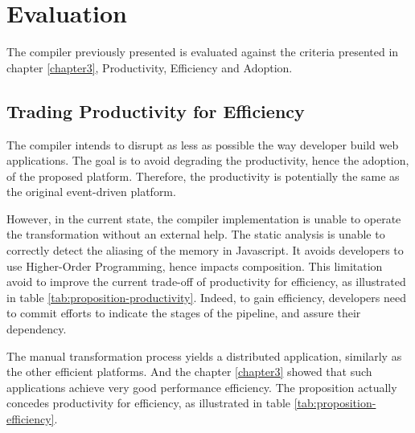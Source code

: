 \section{Evaluation} \label{chapter4:evaluation}

The compiler previously presented is evaluated against the criteria presented in chapter \ref{chapter3}, Productivity, Efficiency and Adoption.

\subsection{Trading Productivity for Efficiency}


The compiler intends to disrupt as less as possible the way developer build web applications.
The goal is to avoid degrading the productivity, hence the adoption, of the proposed platform.
Therefore, the productivity is potentially the same as the original event-driven platform.

However, in the current state, the compiler implementation is unable to operate the transformation without an external help.
The static analysis is unable to correctly detect the aliasing of the memory in Javascript.
It avoids developers to use Higher-Order Programming, hence impacts composition.
This limitation avoid to improve the current trade-off of productivity for efficiency, as illustrated in table \ref{tab:proposition-productivity}.
Indeed, to gain efficiency, developers need to commit efforts to indicate the stages of the pipeline, and assure their dependency.


The manual transformation process yields a distributed application, similarly as the other efficient platforms.
And the chapter \ref{chapter3} showed that such applications achieve very good performance efficiency.
The proposition actually concedes productivity for efficiency, as illustrated in table \ref{tab:proposition-efficiency}.


